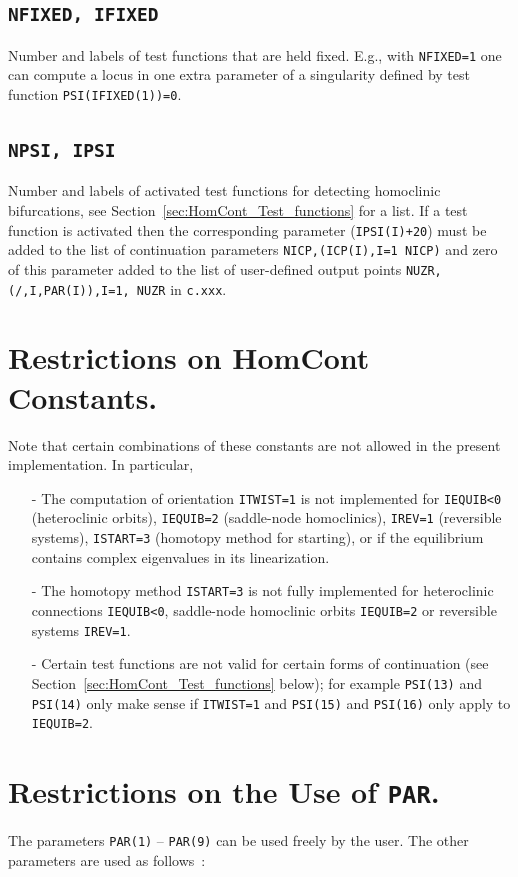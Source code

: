\documentclass[12pt]{report}
\begin{document}
\subsection{\tt NFIXED, IFIXED}  \label{sec:IFIXED}
Number and labels of test functions that are held fixed. 
E.g., with {\tt NFIXED=1} one can compute a locus in
one extra parameter of a singularity defined by 
test function {\tt PSI(IFIXED(1))=0}.

\subsection{\tt NPSI, IPSI}  \label{sec:IPSI}
Number and labels of activated test functions for detecting homoclinic
bifurcations, see Section~\ref{sec:HomCont_Test_functions} 
for a list. If a test function is activated then the
corresponding parameter ({\tt IPSI(I)+20}) 
must be added to the list of continuation parameters {\tt NICP,(ICP(I),I=1 NICP)}
and zero of this parameter added to the list of user-defined
output points {\tt NUZR,} {\tt (/,I,PAR(I)),I=1, NUZR} in {\tt c.xxx}.

\section{ Restrictions on {\cal HomCont} Constants.}
Note that certain combinations of these constants are not allowed
in the present implementation. In particular,
\begin{itemize}
\item[-] 
The computation of orientation {\tt ITWIST=1} is not
implemented for {\tt IEQUIB<0} (heteroclinic orbits), 
{\tt IEQUIB=2} (saddle-node homoclinics),
{\tt IREV=1} (reversible systems), {\tt ISTART=3} (homotopy
method for starting), or if the equilibrium contains complex
eigenvalues in its linearization.  
\item[-] The homotopy method {\tt ISTART=3} is not fully implemented
for heteroclinic connections {\tt IEQUIB<0}, saddle-node homoclinic
orbits {\tt IEQUIB=2} or reversible systems {\tt IREV=1}.
\item[-] Certain test functions are not valid for certain forms
of continuation 
(see Section~\ref{sec:HomCont_Test_functions} below); 
for example
{\tt PSI(13)} and {\tt PSI(14)} only make sense if 
{\tt ITWIST=1} and {\tt PSI(15)} and {\tt PSI(16)} only apply
to {\tt IEQUIB=2}.
\end{itemize}

\section{ Restrictions on the Use of {\tt PAR}.}
The parameters {\tt PAR(1)} -- {\tt PAR(9)} can be used freely by
the user. The other parameters are used as follows~:
\end{document}
